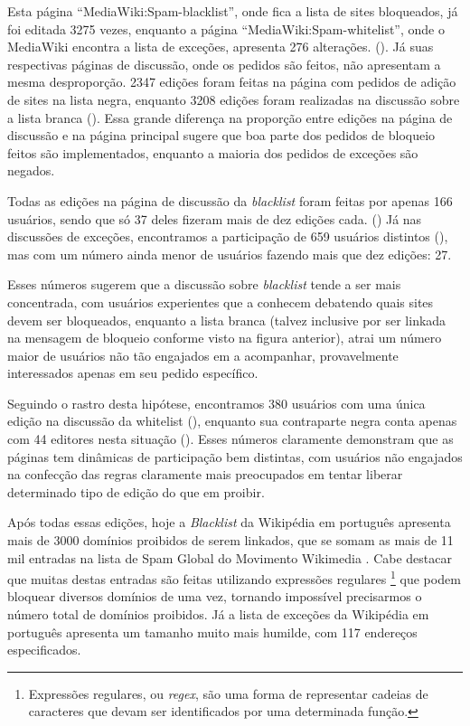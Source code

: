 Esta página ``MediaWiki:Spam-blacklist'', onde fica a lista de sites bloqueados, já foi editada 3275 vezes, enquanto a página ``MediaWiki:Spam-whitelist'', onde o MediaWiki encontra a lista de exceções,  apresenta 276 alterações. (\cite{quarry_edit_mediawiki_namespace}). Já suas respectivas páginas de discussão, onde os pedidos são feitos, não apresentam a mesma desproporção. 2347 edições foram feitas na página com pedidos de adição de sites na lista negra, enquanto 3208 edições foram realizadas na discussão sobre a lista branca (\cite{quarry_edit_mediawiki_talk_namespace}). Essa grande diferença na proporção entre edições na página de discussão e na página principal sugere que boa parte dos pedidos de bloqueio feitos são implementados, enquanto a maioria dos pedidos de exceções são negados.

Todas as edições na página de discussão da \textit{blacklist} foram feitas por apenas 166 usuários, sendo que só 37 deles fizeram mais de dez edições cada. (\cite{quarry_edit_sbl_talk_page}) Já nas discussões de exceções, encontramos a participação de 659 usuários distintos (\cite{quarry_edit_swl_talk_page}), mas com um número ainda menor de usuários fazendo mais que dez edições: 27.

Esses números sugerem que a discussão sobre \textit{blacklist} tende a ser mais concentrada, com usuários experientes que a conhecem debatendo quais sites devem ser bloqueados, enquanto a lista branca (talvez inclusive por ser linkada na mensagem de bloqueio conforme visto na figura anterior), atrai um número maior de usuários não tão engajados em a acompanhar, provavelmente interessados apenas em seu pedido específico.

Seguindo o rastro desta hipótese, encontramos 380 usuários com uma única edição na discussão da whitelist (\cite{quarry_only_1edit_swl_talk_page}), enquanto sua contraparte negra conta apenas com 44 editores nesta situação (\cite{quarry_only_1edit_sbl_talk_page}). Esses números claramente demonstram que as páginas tem dinâmicas de participação bem distintas, com usuários não engajados na confecção das regras claramente mais preocupados em tentar liberar determinado tipo de edição do que em proibir.

Após todas essas edições, hoje a \textit{Blacklist} da Wikipédia em português apresenta mais de 3000 domínios proibidos de serem linkados, que se somam as mais de 11 mil entradas na lista de Spam Global do Movimento Wikimedia . Cabe destacar que muitas destas entradas são feitas utilizando expressões regulares \footnote{Expressões regulares, ou \textit{regex}, são uma forma de representar cadeias de caracteres que devam ser identificados por uma determinada função.} que podem bloquear diversos domínios de uma vez, tornando impossível precisarmos o número total de domínios proibidos. Já a lista de exceções da Wikipédia em português apresenta um tamanho muito mais humilde, com 117 endereços especificados.

